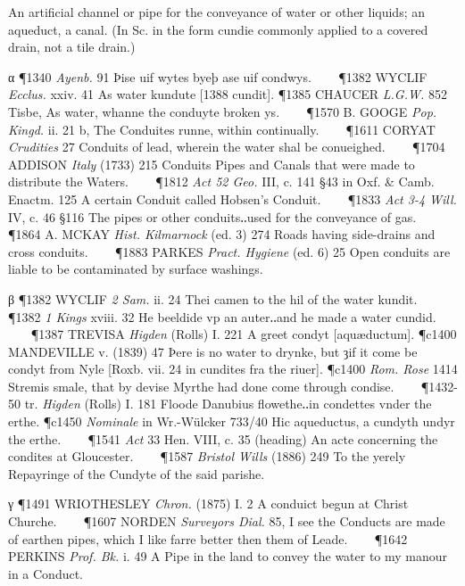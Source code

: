 \begin{description}[wide, labelwidth=!, labelindent=0pt]
\begin{myenumerate}
 An artificial channel or pipe for the conveyance of water or other liquids; an aqueduct, a canal. (In Sc. in the form cundie commonly applied to a covered drain, not a tile drain.)

\noindent α \P 1340  \textit{Ayenb.} 91 Þise uif wytes byeþ ase uif condwys.    
\P 1382 WYCLIF  \textit{Ecclus.} xxiv. 41 As water kundute [1388 cundit].
\P 1385 CHAUCER  \textit{L.G.W.} 852 Tisbe, As water, whanne the conduyte broken ys.    
\P 1570 B. GOOGE  \textit{Pop. Kingd.} ii. 21 b, The Conduites runne, within continually.    
\P 1611 CORYAT  \textit{Crudities} 27 Conduits of lead, wherein the water shal be conueighed.    
\P 1704 ADDISON  \textit{Italy} (1733) 215 Conduits Pipes and Canals that were made to distribute the Waters.    
\P 1812  \textit{Act 52 Geo.} III, c. 141 §43 in Oxf. \& Camb. Enactm. 125 A certain Conduit called Hobsen's Conduit.    
\P 1833  \textit{Act 3-4 Will.} IV, c. 46 §116 The pipes or other conduits‥used for the conveyance of gas.    
\P 1864 A. MCKAY  \textit{Hist. Kilmarnock} (ed. 3) 274 Roads having side-drains and cross conduits.    
\P 1883 PARKES  \textit{Pract. Hygiene} (ed. 6) 25 Open conduits are liable to be contaminated by surface washings.

\noindent β \P 1382 WYCLIF  \textit{2 Sam.} ii. 24 Thei camen to the hil of the water kundit.    
\P 1382 \textit{1 Kings} xviii. 32 He beeldide vp an auter‥and he made a water cundid.    
\P 1387 TREVISA  \textit{Higden} (Rolls) I. 221 A greet condyt [aquæductum].
\P c1400 MANDEVILLE  v. (1839) 47 Þere is no water to drynke, but ȝif it come be condyt from Nyle [Roxb. vii. 24 in cundites fra the riuer].
\P c1400  \textit{Rom. Rose} 1414 Stremis  smale, that by devise Myrthe had done come through condise.    
\P 1432-50 tr. \textit{Higden} (Rolls) I. 181 Floode Danubius flowethe‥in condettes vnder the erthe.
\P c1450 \textit{Nominale} in  Wr.-Wülcker 733/40 Hic aqueductus, a cundyth undyr the erthe.    
\P 1541  \textit{Act} 33 Hen. VIII, c. 35 (heading) An acte concerning the condites at Gloucester.    
\P 1587 \textit{Bristol  Wills} (1886) 249 To the yerely Repayringe of the Cundyte of the said parishe.

\noindent γ \P 1491 WRIOTHESLEY  \textit{Chron.} (1875) I. 2 A conduict begun at Christ Churche.    
\P 1607 NORDEN  \textit{Surveyors Dial.} 85, I see the Conducts are made of earthen pipes, which I like farre better then them of Leade.    
\P 1642 PERKINS  \textit{Prof. Bk.} i. 49 A Pipe in the land to convey the water to my manour in a Conduct.


\end{myenumerate}
\end{description}
